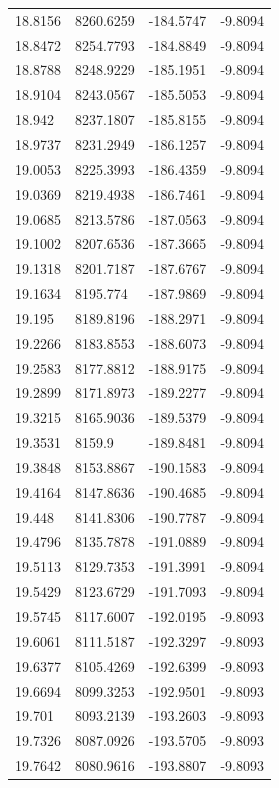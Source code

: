 \begin{table}[H]
\begin{tabular}{llll}
18.8156 & 8260.6259 & -184.5747 & -9.8094 \\
18.8472 & 8254.7793 & -184.8849 & -9.8094 \\
18.8788 & 8248.9229 & -185.1951 & -9.8094 \\
18.9104 & 8243.0567 & -185.5053 & -9.8094 \\
18.942 & 8237.1807 & -185.8155 & -9.8094 \\
18.9737 & 8231.2949 & -186.1257 & -9.8094 \\
19.0053 & 8225.3993 & -186.4359 & -9.8094 \\
19.0369 & 8219.4938 & -186.7461 & -9.8094 \\
19.0685 & 8213.5786 & -187.0563 & -9.8094 \\
19.1002 & 8207.6536 & -187.3665 & -9.8094 \\
19.1318 & 8201.7187 & -187.6767 & -9.8094 \\
19.1634 & 8195.774 & -187.9869 & -9.8094 \\
19.195 & 8189.8196 & -188.2971 & -9.8094 \\
19.2266 & 8183.8553 & -188.6073 & -9.8094 \\
19.2583 & 8177.8812 & -188.9175 & -9.8094 \\
19.2899 & 8171.8973 & -189.2277 & -9.8094 \\
19.3215 & 8165.9036 & -189.5379 & -9.8094 \\
19.3531 & 8159.9 & -189.8481 & -9.8094 \\
19.3848 & 8153.8867 & -190.1583 & -9.8094 \\
19.4164 & 8147.8636 & -190.4685 & -9.8094 \\
19.448 & 8141.8306 & -190.7787 & -9.8094 \\
19.4796 & 8135.7878 & -191.0889 & -9.8094 \\
19.5113 & 8129.7353 & -191.3991 & -9.8094 \\
19.5429 & 8123.6729 & -191.7093 & -9.8094 \\
19.5745 & 8117.6007 & -192.0195 & -9.8093 \\
19.6061 & 8111.5187 & -192.3297 & -9.8093 \\
19.6377 & 8105.4269 & -192.6399 & -9.8093 \\
19.6694 & 8099.3253 & -192.9501 & -9.8093 \\
19.701 & 8093.2139 & -193.2603 & -9.8093 \\
19.7326 & 8087.0926 & -193.5705 & -9.8093 \\
19.7642 & 8080.9616 & -193.8807 & -9.8093 \\

\end{tabular}
\end{table}
